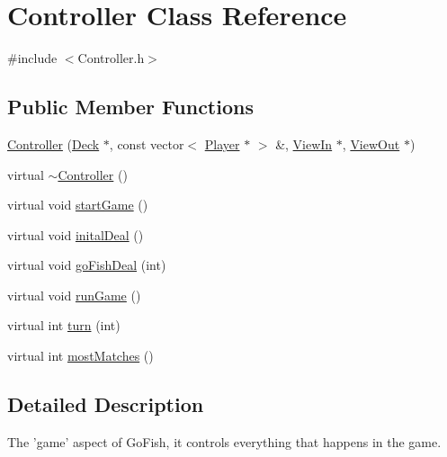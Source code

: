 \hypertarget{class_controller}{\section{Controller Class Reference}
\label{class_controller}
}


{\ttfamily \#include $<$Controller.\-h$>$}

\subsection*{Public Member Functions}
\begin{DoxyCompactItemize}
\item 
\hyperlink{class_controller_acf8bff1d72a321576a4f02fd807890ea}{Controller} (\hyperlink{class_deck}{Deck} $\ast$, const vector$<$ \hyperlink{class_player}{Player} $\ast$ $>$ \&, \hyperlink{class_view_in}{View\-In} $\ast$, \hyperlink{class_view_out}{View\-Out} $\ast$)
\item 
virtual \hyperlink{class_controller_a867c1b386aa6e63d986a01ddaeccea5a}{$\sim$\-Controller} ()
\item 
virtual void \hyperlink{class_controller_a675852bf455a68a6e7681ade0f3cd851}{start\-Game} ()
\item 
virtual void \hyperlink{class_controller_aa39109370d9241c1ed0139e6ce12fb79}{inital\-Deal} ()
\item 
virtual void \hyperlink{class_controller_acab8e5a490b0d4ad04691d8b6adf2f37}{go\-Fish\-Deal} (int)
\item 
virtual void \hyperlink{class_controller_afb9b6ad7b11457b04f810de0a0c25cb0}{run\-Game} ()
\item 
virtual int \hyperlink{class_controller_aa39afb7d32ac233b4e655399680fe4ae}{turn} (int)
\item 
virtual int \hyperlink{class_controller_ac4f2c8778b9b8ede92d38254f002feb8}{most\-Matches} ()
\end{DoxyCompactItemize}


\subsection{Detailed Description}
The 'game' aspect of Go\-Fish, it controls everything that happens in the game. 

